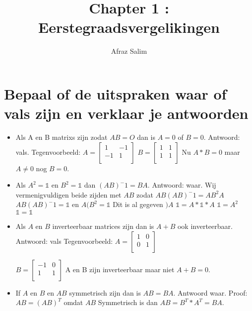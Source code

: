 \documentclass{article}
\begin{document}
\title{Chapter 1 : Eerstegraadsvergelikingen}
\author{Afraz Salim}
\maketitle
\section{Bepaal of de uitspraken waar of vals zijn en verklaar je antwoorden}
\begin{itemize}
\item Als A en B matrixs zijn zodat $AB = O$ dan is $A = 0$ of $B = 0$.
\newline
Antwoord: vals.
\newline
Tegenvoorbeeld: $A = 
\begin{bmatrix}
1 &-1 \\
-1&  1\\
\end{bmatrix}
$
$ B = 
\begin{bmatrix}
1 & 1\\
1 & 1\\
\end{bmatrix}
$
Nu $A*B = 0$ maar $A  \neq 0$ nog $B = 0$.

\item Als $A ^2 = \mathbb{1}$ en $B^2 = \mathbb{1}$ dan $(AB)^-1 = BA$.
\newline
Antwoord: waar.
\newline
Wij vermenigvuldigen beide zijden met $AB$ zodat $AB(AB)^-1 = AB^2A $\newline
$AB(AB)^-1 = \mathbb{1}$ en $A(B^2 = \mathbb{1}$ Dit is al gegeven $) A$ \newline
$\mathbb{1} = A*\mathbb{1}*A$\newline
$\mathbb{1} = A^2$\newline
$\mathbb{1} = \mathbb{1}$\newline

\item  Als $A$ en $B$ inverteerbaar matrices zijn dan is $A + B$ ook inverteerbaar.\newline
Antwoord: vals\newline
Tegenvoorbeeld:
   $A = \begin{bmatrix}
   1 & 0\\
   0 & 1\\
   \end{bmatrix}$
   
   $B = \begin{bmatrix}
   -1 & 0\\
    1 & 1\\
   \end{bmatrix}
   $
A en B zijn inverteerbaar maar niet $A+B = 0$.
\item If $A$ en $B$ en $AB$ symmetrisch zijn dan is $AB = BA$.\newline
 Antwoord waar.\newline
 Proof: $AB = (AB)^T$ omdat $AB$ Symmetrisch is dan $AB = B^T*A^T = BA$.


\end{itemize}
\end{document}
